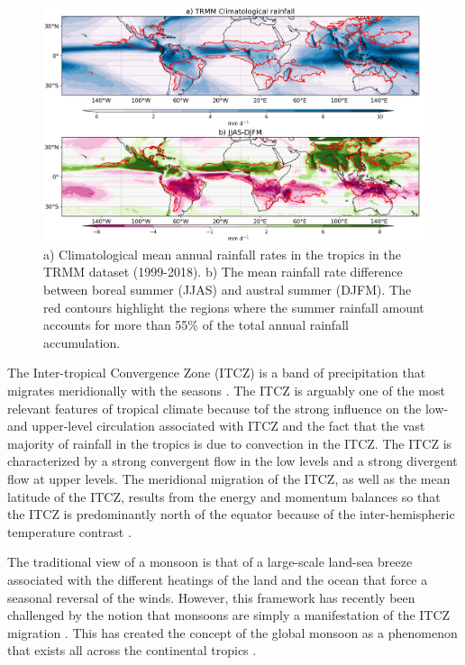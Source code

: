 \begin{figure}
\includegraphics[width=\linewidth]{figures/trmmclima.png}
\caption{a) Climatological mean annual rainfall rates in the tropics in the TRMM dataset (1999-2018). b) The mean rainfall rate difference between boreal summer (JJAS) and austral summer (DJFM). The red contours highlight the regions where the summer rainfall amount accounts for more than 55\% of the total annual rainfall accumulation. }
\label{fig:monsoon}
\end{figure}

The Inter-tropical Convergence Zone (ITCZ) is a band of precipitation that migrates meridionally with the seasons \citep{schneider2014}. The ITCZ is arguably one of the most relevant features of tropical climate because tof the strong influence on the low- and upper-level circulation associated with ITCZ and the fact that the vast majority of rainfall in the tropics is due to convection in the ITCZ. The ITCZ is characterized by a strong convergent flow in the low levels and a strong divergent flow at upper levels. 
The meridional migration of the ITCZ, as well as the mean latitude of the ITCZ, results from the energy and momentum balances so that the ITCZ is predominantly north of the equator because of the inter-hemispheric temperature contrast \citep{donohoe2013,bischoff2016}.

The traditional view of a monsoon is that of a large-scale land-sea breeze associated with the different heatings of the land and the ocean that force a seasonal reversal of the winds. However, this framework has recently been challenged by the notion that monsoons are simply a manifestation of the ITCZ migration \citep{gadgil2018}. This has created the concept of the global monsoon as a phenomenon that exists all across the continental tropics \citep{zhou2016,gadgil2018}. 


